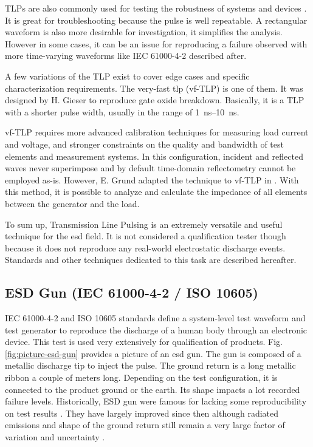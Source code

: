TLPs are also commonly used for testing the robustness of systems and devices \cite{TLPthroubleshooting, LacrampeTransientImmunity}.
It is great for troubleshooting because the pulse is well repeatable.
A rectangular waveform is also more desirable for investigation, it simplifies the analysis.
However in some cases, it can be an issue for reproducing a failure observed with more time-varying waveforms like IEC 61000-4-2 \cite{iec61000-4-2} described after.

A few variations of the TLP exist to cover edge cases and specific characterization requirements.
The very-fast \gls{tlp} (vf-TLP) is one of them.
It was designed by H. Gieser \cite{vf-tlp} to reproduce gate oxide breakdown.
Basically, it is a TLP with a shorter pulse width, usually in the range of \SIrange{1}{10}{\nano\second}.

vf-TLP requires more advanced calibration techniques for measuring load current and voltage, and stronger constraints on the quality and bandwidth of test elements and measurement systems.
In this configuration, incident and reflected waves never superimpose and by default time-domain reflectometry cannot be employed as-is.
However, E. Grund adapted the technique to vf-TLP in \cite{vf-tlp-tdr}.
With this method, it is possible to analyze and calculate the impedance of all elements between the generator and the load.

To sum up, Transmission Line Pulsing is an extremely versatile and useful technique for the \gls{esd} field.
It is not considered a qualification tester though because it does not reproduce any real-world electrostatic discharge events.
Standards and other techniques dedicated to this task are described hereafter.

\subsection{ESD Gun (IEC 61000-4-2 / ISO 10605)}

IEC 61000-4-2 \cite{iec61000-4-2} and ISO 10605 \cite{iso10605} standards define a system-level test waveform and test generator to reproduce the discharge of a human body through an electronic device.
This test is used very extensively for qualification of products.
Fig. \ref{fig:picture-esd-gun} provides a picture of an \gls{esd} gun.
The gun is composed of a metallic discharge tip to inject the pulse.
The ground return is a long metallic ribbon a couple of meters long.
Depending on the test configuration, it is connected to the product ground or the earth.
Its shape impacts a lot recorded failure levels.
Historically, ESD gun were famous for lacking some reproducibility on test results \cite{hmm-uncertainty}.
They have largely improved since then although radiated emissions and shape of the ground return still remain a very large factor of variation and uncertainty \cite{gun-rf-uncertainty}.

